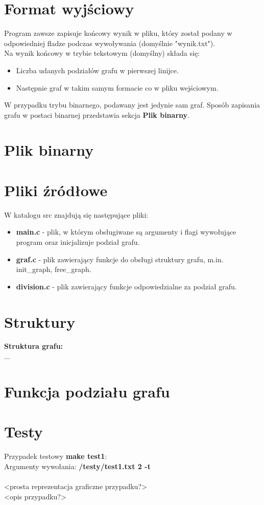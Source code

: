 \documentclass{article}
\begin{document}
\section*{Format wyjściowy}
Program zawsze zapisuje końcowy wynik w pliku, który został podany w odpowiedniej fladze podczas wywoływania (domyślnie "wynik.txt").\\

Na wynik końcowy w trybie tekstowym (domyślny) składa się:
\begin{itemize}
    \item Liczba udanych podziałów grafu w pierwszej linijce.

    \item Następnie graf w takim samym formacie co w pliku wejściowym.
\end{itemize}

W przypadku trybu binarnego, podawany jest jedynie sam graf. Sposób zapisania grafu w postaci binarnej przedstawia sekcja \textbf{Plik binarny}.

\section*{Plik binarny}

\section*{Pliki źródłowe}
W katalogu src znajdują się następujące pliki:
\begin{itemize}
    \item \textbf{main.c} - plik, w którym obsługiwane są argumenty i flagi wywołujące program oraz inicjalizuje podział grafu.

    \item \textbf{graf.c} - plik zawierający funkcje do obsługi struktury grafu, m.in. init\_graph, free\_graph.

    \item \textbf{division.c} - plik zawierający funkcje odpowiedzialne za podział grafu.
    
\end{itemize}

\section*{Struktury}
\textbf{Struktura grafu:}\\
...

\section*{Funkcja podziału grafu}

\section*{Testy}
Przypadek testowy \textbf{make test1}:\\
Argumenty wywołania: \textbf{/testy/test1.txt 2 -t}\\\\
<prosta reprezentacja graficzne przypadku?>\\
<opis przypadku?>
\end{document}
